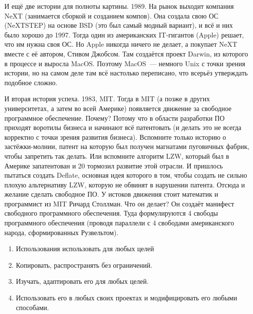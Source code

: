 \documentclass{article}
\begin{document}
    И ещё две истории для полноты картины. 1989. На рынок выходит компания NeXT (занимается сборкой и созданием компов). Она создала свою ОС (NeXTSTEP) на основе BSD (это был самый модный вариант), и всё и них было хорошо до 1997. Тогда один из американских IT-гигантов (Apple) решает, что им нужна своя ОС. Но Apple никогда ничего не делает, а покупает NeXT вместе с её автором, Стивом Джобсом. Там создаётся проект Darwin, из которого в процессе и выросла MacOS. Поэтому MacOS~--- немного Unix с точки зрения истории, но на самом деле там всё настолько переписано, что всерьёз утверждать подобное сложно.
    
    И вторая история успеха. 1983, MIT. Тогда в MIT (а позже в других университетах, а затем во всей Америке) появляется движение за свободное программное обеспечение. Почему? Потому что в области разработки ПО приходят воротилы бизнеса и начинают всё патентовать (и делать это не всегда корректно с точки зрения развития бизнеса). Вспомните только историю о застёжки-молнии, патент на которую был получен магнатами пуговичных фабрик, чтобы запретить так делать. Или вспомните алгоритм LZW, который был в Америке запатентован и 20 тормозил развитие этой отрасли. И пришлось пытаться создать Deflate, основная идея которого в том, чтобы создать не сильно плохую альтернативу LZW, которую не обвинят в нарушении патента. Отсюда и желание сделать свободное ПО. У истоков движения стоит математик и программист из MIT Ричард Столлман. Что он делает? Он создаёт манифест свободного программного обеспечения. Туда формулируются 4 свободы программного обеспечения (проводя параллели с 4 свободами американского народа, сформированных Рузвельтом).
    \begin{enumerate}
        \addtocounter{enumi}{-1}
        \item Использования использовать для любых целей
        \item Копировать, распространять без ограничений.
        \item Изучать, адаптировать его для любых целей.
        \item Использовать его в любых своих проектах и модифицировать его любыми способами.
    \end{enumerate}
\end{document}
